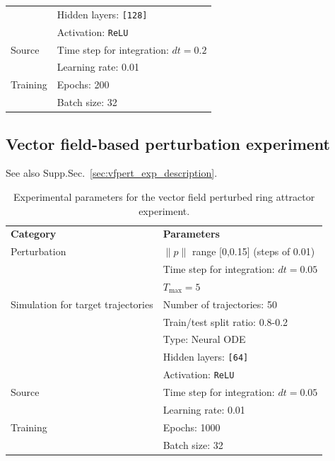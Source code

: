 \documentclass{article}
\theoremstyle{definition} \newtheorem{definition}{Definition}  \newtheorem{example}{Example}
\theoremstyle{remark} \newtheorem{remark}{Remark}
\newcounter{ct}
\begin{document}
\begin{table}[h]
\begin{tabular}{p{5cm}p{6cm}}
    & Hidden layers: \texttt{[128]} \\
    & Activation: \texttt{ReLU} \\
\midrule
\multirow{1}{*}{Source}
    & Time step for integration: $dt=0.2$ \\
 \midrule
\multirow{3}{*}{Training} 
    & Learning rate:  0.01 \\
    & Epochs: 200 \\
    & Batch size: 32 \\
\bottomrule
\end{tabular}
\end{table}








\subsection{Vector field-based perturbation experiment}\label{sec:vfpert_exp_details}
See also Supp.Sec.~\ref{sec:vfpert_exp_description}.

\begin{table}[h]
\centering
\caption{Experimental parameters for the vector field perturbed ring attractor experiment.}
\label{tab:vfpert_params}
\begin{tabular}{p{5cm}p{6cm}}
\toprule
\textbf{Category} & \textbf{Parameters} \\
\multirow{1}{*}{Perturbation} 
    & $\|p\|$ range [0,0.15] (steps of 0.01) \\
\midrule
\multirow{5}{*}{Simulation for target trajectories} 
    & Time step for integration: $dt=0.05$ \\
    &  $T_{\text{max}} = 5$ \\
    & Number of trajectories: 50 \\
    & Train/test split ratio: 0.8-0.2 \\
\midrule
\multirow{3}{*}{Learned diffeomorphism} 
    & Type: Neural ODE \\
    & Hidden layers: \texttt{[64]} \\
    & Activation: \texttt{ReLU} \\
\midrule
\multirow{1}{*}{Source}
    & Time step for integration: $dt=0.05$ \\
 \midrule
\multirow{3}{*}{Training} 
    & Learning rate:  0.01 \\
    & Epochs: 1000 \\
    & Batch size: 32 \\
\bottomrule
\end{tabular}
\end{table}
\end{document}
